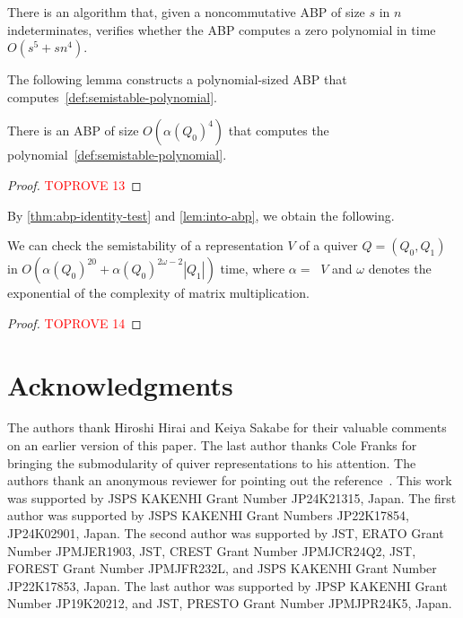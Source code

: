 \documentclass[a4paper,11pt]{article}
\numberwithin{equation}{section}
\DeclareMathOperator{\dimv}{\underline{dim}}
\begin{document}
\begin{theorem}\label{thm:abp-identity-test}
    There is an algorithm that, given a noncommutative ABP of size $s$ in $n$ indeterminates, verifies whether the ABP computes a zero polynomial in time $O(s^5 + sn^4)$.
\end{theorem}

The following lemma constructs a polynomial-sized ABP that computes~\eqref{def:semistable-polynomial}.

\begin{lemma}\label{lem:into-abp}
    There is an ABP of size $O({\alpha(Q_0)}^4)$ that computes the polynomial~\eqref{def:semistable-polynomial}.
\end{lemma}

\begin{proof}\textcolor{red}{TOPROVE 13}\end{proof}

By \cref{thm:abp-identity-test} and \cref{lem:into-abp}, we obtain the following.

\begin{theorem}
    We can check the semistability of a representation $V$ of a quiver $Q = (Q_0, Q_1)$ in $O({\alpha(Q_0)}^{20} + {\alpha(Q_0)}^{2\omega - 2} |Q_1|)$ time, where $\alpha = \dimv V$ and $\omega$ denotes the exponential of the complexity of matrix multiplication.
\end{theorem}

\begin{proof}\textcolor{red}{TOPROVE 14}\end{proof}

\section*{Acknowledgments}
The authors thank Hiroshi Hirai and Keiya Sakabe for their valuable comments on an earlier version of this paper.
The last author thanks Cole Franks for bringing the submodularity of quiver representations to his attention.
The authors thank an anonymous reviewer for pointing out the reference~\cite{Mulmuley2017}.
This work was supported by JSPS KAKENHI Grant Number JP24K21315, Japan.
The first author was supported by JSPS KAKENHI Grant Numbers JP22K17854, JP24K02901, Japan.
The second author was supported by JST, ERATO Grant Number JPMJER1903, JST, CREST Grant Number JPMJCR24Q2, JST, FOREST Grant Number JPMJFR232L, and JSPS KAKENHI Grant Number JP22K17853, Japan.
The last author was supported by JPSP KAKENHI Grant Number JP19K20212, and JST, PRESTO Grant Number JPMJPR24K5, Japan.
\end{document}
